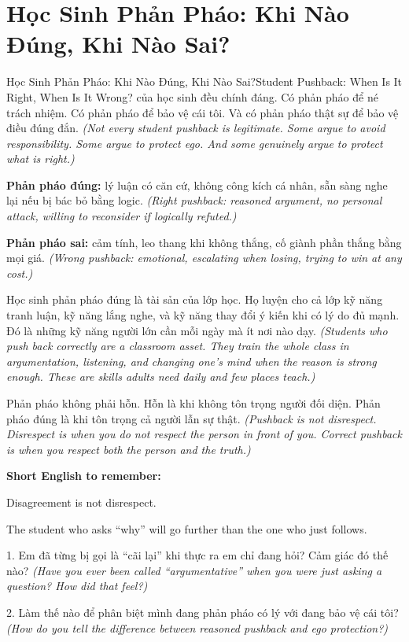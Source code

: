 \section{Học Sinh Phản Pháo: Khi Nào Đúng, Khi Nào Sai?}
\begin{truyen}{Học Sinh Phản Pháo: Khi Nào Đúng, Khi Nào Sai?}{Student Pushback: When Is It Right, When Is It Wrong?}
 của học sinh đều chính đáng. Có phản pháo để né trách nhiệm. Có phản pháo để bảo vệ cái tôi. Và có phản pháo thật sự để bảo vệ điều đúng đắn.
\textit{(Not every student pushback is legitimate. Some argue to avoid responsibility. Some argue to protect ego. And some genuinely argue to protect what is right.)}

\textbf{Phản pháo đúng:} lý luận có căn cứ, không công kích cá nhân, sẵn sàng nghe lại nếu bị bác bỏ bằng logic.
\textit{(Right pushback: reasoned argument, no personal attack, willing to reconsider if logically refuted.)}

\textbf{Phản pháo sai:} cảm tính, leo thang khi không thắng, cố giành phần thắng bằng mọi giá.
\textit{(Wrong pushback: emotional, escalating when losing, trying to win at any cost.)}

\begin{baihoc}
Học sinh phản pháo đúng là tài sản của lớp học. Họ luyện cho cả lớp kỹ năng tranh luận, kỹ năng lắng nghe, và kỹ năng thay đổi ý kiến khi có lý do đủ mạnh. Đó là những kỹ năng người lớn cần mỗi ngày mà ít nơi nào dạy.
\textit{(Students who push back correctly are a classroom asset. They train the whole class in argumentation, listening, and changing one's mind when the reason is strong enough. These are skills adults need daily and few places teach.)}
\end{baihoc}
\end{truyen}

\begin{baihoc}
Phản pháo không phải hỗn. Hỗn là khi không tôn trọng người đối diện. Phản pháo đúng là khi tôn trọng cả người lẫn sự thật.
\textit{(Pushback is not disrespect. Disrespect is when you do not respect the person in front of you. Correct pushback is when you respect both the person and the truth.)}
\end{baihoc}

\begin{ghinhoanh}
\textbf{Short English to remember:}

Disagreement is not disrespect.

The student who asks ``why'' will go further than the one who just follows.
\end{ghinhoanh}

\begin{tuhocnhanh}
1. Em đã từng bị gọi là ``cãi lại'' khi thực ra em chỉ đang hỏi? Cảm giác đó thế nào? \textit{(Have you ever been called ``argumentative'' when you were just asking a question? How did that feel?)}

2. Làm thế nào để phân biệt mình đang phản pháo có lý với đang bảo vệ cái tôi? \textit{(How do you tell the difference between reasoned pushback and ego protection?)}
\end{tuhocnhanh}

\ngancach
